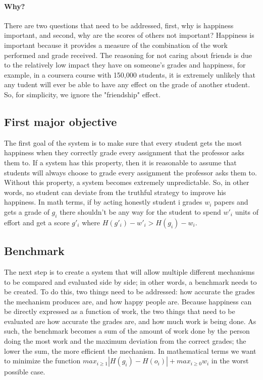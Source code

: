 \documentclass[12pt, Arial]{article}
\begin{document}
\paragraph{Why?}
There are two questions that need to be addressed, first, why is happiness important, and second, why are the scores of others not important? Happiness is important because it provides a measure of the combination of the work performed and grade received. The reasoning for not caring about friends is due to the relatively low impact they have on someone's grades and happiness, for example, in a coursera course with 150,000 students, it is extremely unlikely that any tudent will ever be able to have any effect on the grade of another student. So, for simplicity, we ignore the "friendship" effect.
\subsection{First major objective}
The first goal of the system is to make sure that every student gets the most happiness when they correctly grade every assignment that the professor asks them to. If a system has this property, then it is reasonable to assume that students will always choose to grade every assignment the professor asks them to. Without this property, a system becomes extremely unpredictable. So, in other words, no student can deviate from the truthful strategy to improve his happiness. In math terms, if by acting honestly student i grades $w_i$ papers and gets a grade of $g_i$ there shouldn't be any way for the student to spend $w'_i$ units of effort and get a score $g'_i$ where $H(g'_i)-w'_i > H(g_i)-w_i$.

\subsection{Benchmark}
The next step is to create a system that will allow multiple different mechanisms to be compared and evaluated side by side; in other words, a benchmark needs to be created. To do this, two things need to be addressed: how accurate the grades the mechanism produces are, and how happy people are. Because happiness can be directly expressed as a function of work, the two things that need to be evaluated are how accurate the grades are, and how much work is being done. As such, the benchmark becomes a sum of the amount of work done by the person doing the most work and the maximum deviation from the correct grades; the lower the sum, the more efficient the mechanism. In mathematical terms we want to minimize the function $max_{i \ge 1} |H(g_i)-H(o_i)| + max_{i \ge 0} w_i$ in the worst possible case.
\end{document}
